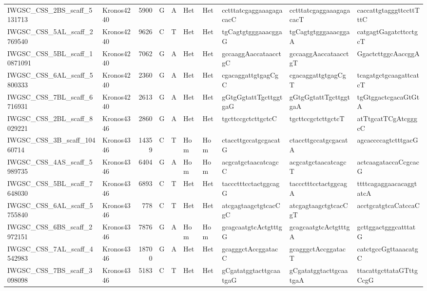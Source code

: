 \begin{longtable}{llrlllllll}
 IWGSC\_CSS\_2BS\_scaff\_5131713  & Kronos4240 &  5900 & G    & A     & Het    & Het   & cctttatcgaggaaagagacacC  & cctttatcgaggaaagagacacT  & caccattgtagggttccttTttC  \\
 IWGSC\_CSS\_5AL\_scaff\_2769540  & Kronos4240 &  9626 & C    & T     & Het    & Het   & tgCagtgtgggaaacggaG      & tgCagtgtgggaaacggaA      & catgagtGagatcttcctgcT    \\
 IWGSC\_CSS\_5BL\_scaff\_10871091 & Kronos4240 &  7062 & G    & A     & Het    & Het   & gccaaggAaccataacctgC     & gccaaggAaccataacctgT     & GgactcttggcAaccggA       \\
 IWGSC\_CSS\_6AL\_scaff\_5800333  & Kronos4240 &  2360 & G    & A     & Het    & Het   & cgacaggattgtgagCgC       & cgacaggattgtgagCgT       & tcagatgctgcaagattcatcT   \\
 IWGSC\_CSS\_7BL\_scaff\_6716931  & Kronos4240 &  2613 & G    & A     & Het    & Het   & gGtgGgtattTgcttggtgaG    & gGtgGgtattTgcttggtgaA    & tgGtggactcgacaGtGtA      \\
 IWGSC\_CSS\_2BL\_scaff\_8029221  & Kronos4346 &  2860 & G    & A     & Het    & Het   & tgcttccgctcttgctcC       & tgcttccgctcttgctcT       & atTtgcatTCgAtcgggcC      \\
 IWGSC\_CSS\_3B\_scaff\_10460714  & Kronos4346 & 14359 & C    & T     & Hom    & Hom   & ctaccttgccatgcgacatG     & ctaccttgccatgcgacatA     & agcaccccagtctttgacG      \\
 IWGSC\_CSS\_4AS\_scaff\_5989735  & Kronos4346 &  6404 & G    & A     & Hom    & Hom   & acgcatgctaacatcagcC      & acgcatgctaacatcagcT      & actcaagataccaCcgcacG     \\
 IWGSC\_CSS\_5BL\_scaff\_7648030  & Kronos4346 &  6893 & C    & T     & Het    & Het   & taccctttcctactggcagG     & taccctttcctactggcagA     & ttttcagaggaacacaggtatcA  \\
 IWGSC\_CSS\_6AL\_scaff\_5755840  & Kronos4346 &   778 & C    & T     & Het    & Het   & atcgagtaagctgtcacCgC     & atcgagtaagctgtcacCgT     & acctgcatgtcaCatccaC      \\
 IWGSC\_CSS\_6BS\_scaff\_2972151  & Kronos4346 &  7876 & G    & A     & Hom    & Hom   & gcagcaatgtcActgtttgG     & gcagcaatgtcActgtttgA     & gcttggactgggcatttatG     \\
 IWGSC\_CSS\_7AL\_scaff\_4542983  & Kronos4346 & 18700 & G    & A     & Het    & Het   & gcagggctAccggatacC       & gcagggctAccggatacT       & catctgccGgttaaacatgC     \\
 IWGSC\_CSS\_7BS\_scaff\_3098098  & Kronos4346 &  5183 & C    & T     & Het    & Het   & gCgatatggtacttgcaatgaG   & gCgatatggtacttgcaatgaA   & ttacattgcttataGTttgCcgG  \\

\end{longtable}

